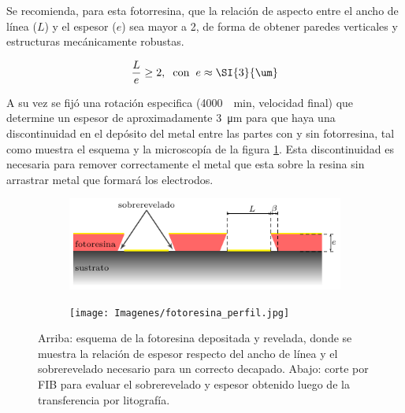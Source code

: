 { 			 Se recomienda, para esta fotorresina, que la relación de aspecto entre el ancho de línea ($L$) y el espesor ($e$) sea mayor a 2, de forma de obtener paredes verticales y estructuras mecánicamente robustas. 

 				\begin{equation}
				\frac{L}{e} \geq 2, \hspace*{0.2cm}\text{con}\hspace{0.2cm}  e \approx \SI{3}{\um}		
 				\end{equation}

     		 A su vez se fijó una rotación especifica (\SI{4000}{\per\minute}, velocidad final) que determine un espesor de aproximadamente \SI{3}{\um} para que haya una discontinuidad en el depósito del metal entre las partes con y sin fotorresina, tal como muestra el esquema y la microscopía de la figura \ref{fig:undercut}. Esta discontinuidad es necesaria para remover correctamente el metal que esta sobre la resina sin arrastrar metal que formará los electrodos. 

 				\begin{figure}[hb!]
 				\centering
 				\begin{subfigure}[t]{0.75\textwidth}
 				\hspace{0.46cm}\includegraphics[width=\textwidth]{Esquemas/altura-ancho.pdf}
 				\end{subfigure}
 				\begin{subfigure}[t]{0.65\textwidth}
 				\texttt{[image: Imagenes/fotoresina\_perfil.jpg]}
 				\end{subfigure}
 				\caption[Perfil de fotorresina para el decapado o\textit{ lift-off}]{Arriba: esquema de la fotoresina depositada y revelada, donde se muestra la relación de espesor respecto del ancho de línea y el sobrerevelado necesario para un correcto decapado. Abajo: corte por FIB para evaluar el sobrerevelado y espesor obtenido luego de la transferencia por litografía.}
 				\label{fig:undercut}
 				\end{figure}

}
